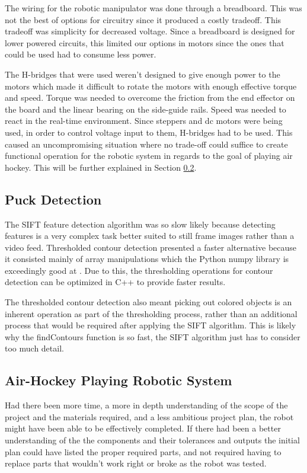 \documentclass[letterpaper, 12 pt, conference]{ieeeconf}
\begin{document}
The wiring for the robotic manipulator was done through a breadboard. This was not the best of options for circuitry since it produced a costly tradeoff.  This tradeoff was simplicity for decreased voltage.  Since a breadboard is designed for lower powered circuits, this limited our options in motors since the ones that could be used had to consume less power. 

The H-bridges that were used weren’t designed to give enough power to the motors which made it difficult to rotate the motors with enough effective torque and speed.  Torque was needed to overcome the friction from the end effector on the board and the linear bearing on the side-guide rails.  Speed was needed to react in the real-time environment.  Since steppers and dc motors were being used, in order to control voltage input to them, H-bridges had to be used. This caused an uncompromising situation where no trade-off could suffice to create functional operation for the robotic system in regards to the goal of playing air hockey. This will be further explained in Section \ref{analysis-airhockeyplayingroboticsystem}.

\subsection{Puck Detection}
\label{analysis-malletmanipulation}
The SIFT feature detection algorithm was so slow likely because detecting features is a very complex task better suited to still frame images rather than a video feed. Thresholded contour detection presented a faster alternative because it consisted mainly of array manipulations which the Python numpy library is exceedingly good at \cite{numpy}. Due to this, the thresholding operations for contour detection can be optimized in C++ to provide faster results.

The thresholded contour detection also meant picking out colored objects is an inherent operation as part of the thresholding process, rather than an additional process that would be required after applying the SIFT algorithm. This is likely why the findContours function is so fast, the SIFT algorithm just has to consider too much detail.

\subsection{Air-Hockey Playing Robotic System}
\label{analysis-airhockeyplayingroboticsystem}
Had there been more time, a more in depth understanding of the scope of the project and the materials required, and a less ambitious project plan, the robot might have been able to be effectively completed. If there had been a better understanding of the the components and their tolerances and outputs the initial plan could have listed the proper required parts, and not required having to replace parts that wouldn’t work right or broke as the robot was tested.
\end{document}
